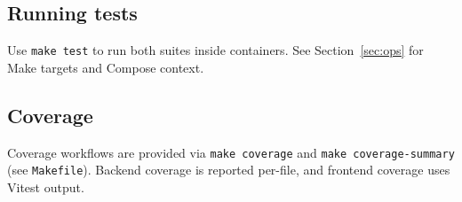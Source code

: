 \subsection{Running tests}
\label{subsec:tests:running}

Use \texttt{make test} to run both suites inside containers. See Section~\ref{sec:ops} for Make targets and Compose context.

\subsection{Coverage}
\label{subsec:tests:coverage}

Coverage workflows are provided via \texttt{make coverage} and \texttt{make coverage-summary} (see \texttt{Makefile}). Backend coverage is reported per-file, and frontend coverage uses Vitest output.
